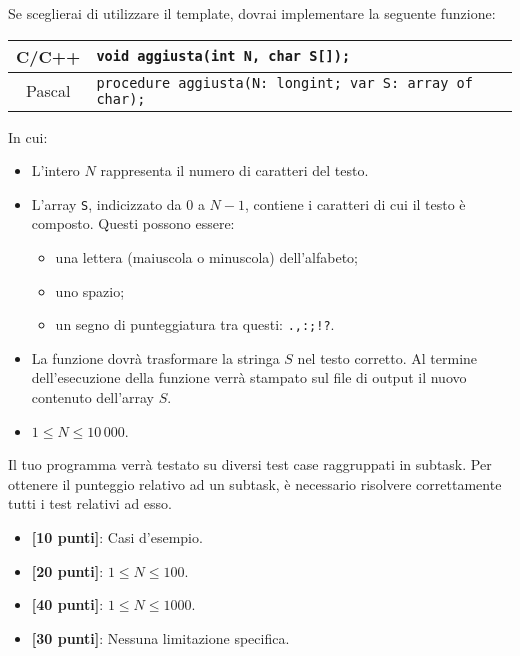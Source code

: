 Se sceglierai di utilizzare il template, dovrai implementare la seguente funzione:
\begin{center}\begin{tabularx}{\textwidth}{|c|X|}
\hline
C/C++  & \verb|void aggiusta(int N, char S[]);|\\
\hline
Pascal & \verb|procedure aggiusta(N: longint; var S: array of char);|\\
\hline
\end{tabularx}\end{center}
In cui:
\begin{itemize}[nolistsep]
  \item L'intero $N$ rappresenta il numero di caratteri del testo.
  \item L'array \texttt{S}, indicizzato da $0$ a $N-1$, contiene i caratteri di cui il testo è composto. Questi possono essere:
  \begin{itemize}[nolistsep]
    \item una lettera (maiuscola o minuscola) dell'alfabeto;
  	\item uno spazio;
  	\item un segno di punteggiatura tra questi: \texttt{.,:;!?}.
  \end{itemize}
  \item La funzione dovrà trasformare la stringa $S$ nel testo corretto. Al termine dell'esecuzione della funzione verrà stampato sul file di output il nuovo contenuto dell'array $S$.
\end{itemize}

\Constraints 
\begin{itemize}[nolistsep,itemsep=2mm]
  \item $1 \le N \le 10\,000$.
\end{itemize}

\pagebreak
\Scoring
Il tuo programma verrà testato su diversi test case raggruppati in subtask.
Per ottenere il punteggio relativo ad un subtask, è necessario risolvere
correttamente tutti i test relativi ad esso.

\begin{itemize}[nolistsep,itemsep=2mm]
  \item \textbf{ [10 punti]}: Casi d'esempio.
  \item \textbf{ [20 punti]}: $1\le N \le 100$.
  \item \textbf{ [40 punti]}: $1 \le N \le 1000$.
  \item \textbf{ [30 punti]}: Nessuna limitazione specifica.
\end{itemize}

\Examples
\begin{example}
%
\end{example}
\begin{example}
%
\end{example}

